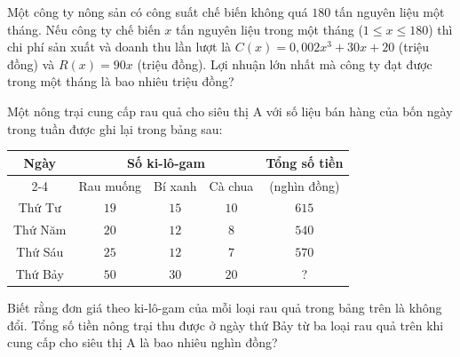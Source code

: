 \begin{ex}%
	Một công ty nông sản có công suất chế biến không quá $180$ tấn nguyên liệu một tháng. Nếu công ty chế biến $x$ tấn nguyên liệu trong một tháng ($1 \le x \le 180$) thì chi phí sản xuất và doanh thu lần lượt là $C(x) = 0{,}002x^3 + 30x + 20$ (triệu đồng) và $R(x) = 90x$ (triệu đồng). Lợi nhuận lớn nhất mà công ty đạt được trong một tháng là bao nhiêu triệu đồng?
	\par{}
\end{ex}

\begin{ex}%
	Một nông trại cung cấp rau quả cho siêu thị A với số liệu bán hàng của bốn ngày trong tuần được ghi lại trong bảng sau:
	\begin{center}
		\renewcommand{\arraystretch}{1.5}
		\begin{tabular}{|c|c|c|c|c|}
			\hline
			\multirow{2}{*}{Ngày} & \multicolumn{3}{c|}{Số ki-lô-gam} & \multirow{2}{*}{Tổng số tiền} \\ \cline{2-4}
			& Rau muống & Bí xanh & Cà chua & (nghìn đồng) \\ \hline
			Thứ Tư & $19$ & $15$ & $10$ & $615$ \\ \hline
			Thứ Năm & $20$ & $12$ & $8$ & $540$ \\ \hline
			Thứ Sáu & $25$ & $12$ & $7$ & $570$ \\ \hline
			Thứ Bảy & $50$ & $30$ & $20$ & ? \\ \hline
		\end{tabular}
	\end{center}
	Biết rằng đơn giá theo ki-lô-gam của mỗi loại rau quả trong bảng trên là không đổi. Tổng số tiền nông trại thu được ở ngày thứ Bảy từ ba loại rau quả trên khi cung cấp cho siêu thị A là bao nhiêu nghìn đồng?
	\par{}
\end{ex}

